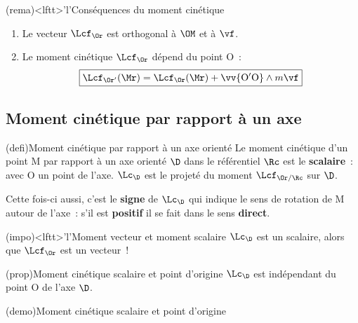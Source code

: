 \documentclass[../../main/main.tex]{subfiles}
\begin{document}
\begin{tcb*}(rema)<lftt>'l'{Conséquences du moment cinétique}
	\begin{enumerate}
		\item Le vecteur $\Lcf_{\Or}$ est orthogonal à $\OM$ et à $\vf$.
		\item Le moment cinétique $\Lcf_{\Or}$ dépend du point O~:
		      \[
			      \boxed{\Lcf_{\Or'}(\Mr) = \Lcf_{\Or}(\Mr) + \vv{\rm O'O}\wedge
				      m\vf}
		      \]
	\end{enumerate}
\end{tcb*}

\subsection{Moment cinétique par rapport à un axe }
\begin{tcb*}[sidebyside, righthand ratio=.2](defi){Moment cinétique par rapport
			à un axe orienté}
	Le moment cinétique d'un point M par rapport à un axe orienté $\D$
	dans le référentiel $\Rc$ est le \textbf{scalaire}~:
	\psw{
		\[
			\boxed{\Lc_{\D}(\Mr) = (\OM\wedge\pf_{\Mr/\Rc})\cdot\ud =
				\Lcf_{\Or/\Rc}(\Mr)\cdot\ud}
		\]
	}%
	avec O un point de l'axe. $\Lc_{\D}$ est le projeté du moment
	$\Lcf_{\Or/\Rc}$ sur $\D$.
	\tcblower
	\psw{
		\[
			\si{J.s}
		\]
	}
\end{tcb*}

Cette fois-ci aussi, c'est le \textbf{signe} de $\Lc_{\D}$ qui indique le sens de
rotation de M autour de l'axe~: s'il est \textbf{positif} il se fait dans le
sens \textbf{direct}.

\begin{tcb*}(impo)<lftt>'l'{Moment vecteur et moment scalaire}
	$\Lc_{\D}$ est un scalaire, alors que $\Lcf_{\Or}$ est un vecteur~!
\end{tcb*}

\begin{tcb*}[cnt](prop){Moment cinétique scalaire et point d'origine}
	$\Lc_{\D}$ est indépendant du point O de l'axe $\D$.
\end{tcb*}
\begin{tcb*}(demo){Moment cinétique scalaire et point d'origine}
	\psw{
		\[
			\Lcf_{\mathrm{O'}/\Rc}\cdot\ud =
			\left[(\vv{\rm O'O}+\OM)\wedge\pf_{\Mr/\Rc}\right]\cdot\ud =
			\underbracket[1pt]{
				(\underbracket[1pt]{\vv{\rm O'O}}_{\parr\ud}\wedge\pf_{\Mr/\Rc})
				\cdot\ud}_{=0}
			+ \Lcf_{\Or/\Rc}\cdot\ud = \Lcf_{\Or/\Rc}\cdot\ud
		\]
	}
	\vspace{-15pt}
\end{tcb*}
\end{document}
